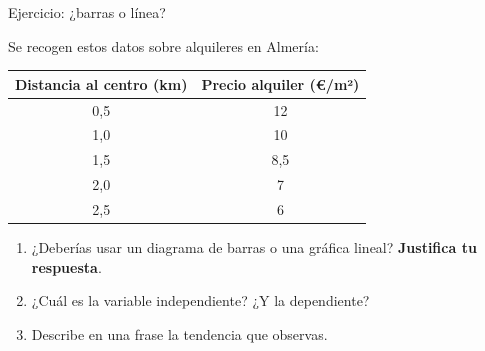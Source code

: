 \documentclass[aspectratio=169, 10pt, spanish]{beamer}
\begin{document}
\begin{frame}{Ejercicio: ¿barras o línea?}
  \begin{comprenderbox}
    Se recogen estos datos sobre alquileres en Almería:

    \vspace{0.2cm}
    \begin{center}
    \AlmFontSmall
    \begin{tabular}{cc}
      \toprule
      \rowcolor{AlmAzul!12}
      \textbf{Distancia al centro (km)} & \textbf{Precio alquiler (€/m²)} \\
      \midrule
      0{,}5 & 12 \\
      \rowcolor{AlmFondo}
      1{,}0 & 10 \\
      1{,}5 & 8{,}5 \\
      \rowcolor{AlmFondo}
      2{,}0 & 7 \\
      2{,}5 & 6 \\
      \bottomrule
    \end{tabular}
    \end{center}

    \vspace{0.2cm}
    \begin{enumerate}
      \item ¿Deberías usar un diagrama de barras o una gráfica lineal?
            \textbf{Justifica tu respuesta}.
      \item ¿Cuál es la variable independiente? ¿Y la dependiente?
      \item Describe en una frase la tendencia que observas.
    \end{enumerate}
  \end{comprenderbox}
\end{frame}
\end{document}
